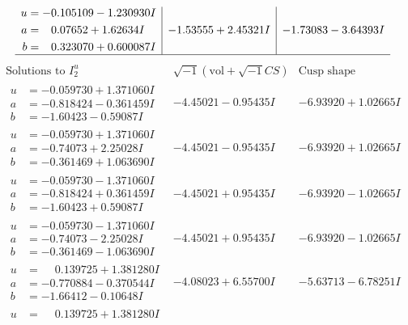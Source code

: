 \documentclass[1p]{elsarticle_modified}
\theoremstyle{definition}
\newcommand{\I}{\sqrt{-1}}
\begin{document}
$$\begin{array}{c|c|c}
\begin{aligned}
u &= -0.105109 - 1.230930 I \\
a &= \phantom{-}0.07652 + 1.62634 I \\
b &= \phantom{-}0.323070 + 0.600087 I\end{aligned}
 & -1.53555 + 2.45321 I & -1.73083 - 3.64393 I\\
 \hline 
 \end{array}$$\newpage$$\begin{array}{c|c|c}  
\text{Solutions to }I^u_{2}& \I (\text{vol} + \sqrt{-1}CS) & \text{Cusp shape}\\
 \hline 
\begin{aligned}
u &= -0.059730 + 1.371060 I \\
a &= -0.818424 - 0.361459 I \\
b &= -1.60423 - 0.59087 I\end{aligned}
 & -4.45021 - 0.95435 I & -6.93920 + 1.02665 I \\ \hline\begin{aligned}
u &= -0.059730 + 1.371060 I \\
a &= -0.74073 + 2.25028 I \\
b &= -0.361469 + 1.063690 I\end{aligned}
 & -4.45021 - 0.95435 I & -6.93920 + 1.02665 I \\ \hline\begin{aligned}
u &= -0.059730 - 1.371060 I \\
a &= -0.818424 + 0.361459 I \\
b &= -1.60423 + 0.59087 I\end{aligned}
 & -4.45021 + 0.95435 I & -6.93920 - 1.02665 I \\ \hline\begin{aligned}
u &= -0.059730 - 1.371060 I \\
a &= -0.74073 - 2.25028 I \\
b &= -0.361469 - 1.063690 I\end{aligned}
 & -4.45021 + 0.95435 I & -6.93920 - 1.02665 I \\ \hline\begin{aligned}
u &= \phantom{-}0.139725 + 1.381280 I \\
a &= -0.770884 - 0.370544 I \\
b &= -1.66412 - 0.10648 I\end{aligned}
 & -4.08023 + 6.55700 I & -5.63713 - 6.78251 I \\ \hline\begin{aligned}
u &= \phantom{-}0.139725 + 1.381280 I \\

\end{aligned}
\end{array}$$
\end{document}
